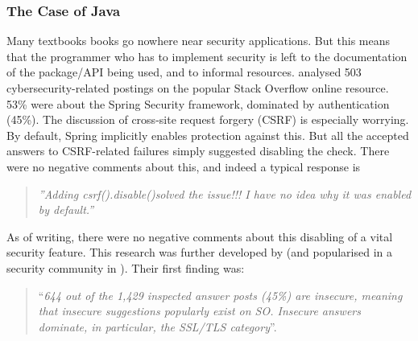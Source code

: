 \documentclass[sigconf]{acmart}
\begin{document}
\subsubsection{The Case of Java}
\begin{comment}
Took out footnotes for space

Many textbooks books go nowhere near security applications.  But this means that the programmer who has to implement security is left to the documentation of the package/API being used, and to informal resources. \cite{Mengetal2018a} analysed 503 cybersecurity-related postings on the popular Stack Overflow online resource.  53\% were about the Spring Security framework  \footnote{\url{https://projects.spring.io/spring-security/}}, dominated by authentication (45\%). The discussion \cite[\S4.3.1]{Mengetal2018a} of cross-site request forgery (CSRF) is especially worrying.  By default, Spring implicitly enables protection against this. But all the accepted answers to CSRF-related failures simply suggested disabling the check. There were no negative comments about this, and indeed a typical response is 
\end{comment}

Many textbooks books go nowhere near security applications.  But this means that the programmer who has to implement security is left to the documentation of the package/API being used, and to informal resources. \cite{Mengetal2018a} analysed 503 cybersecurity-related postings on the popular Stack Overflow online resource.  53\% were about the Spring Security framework, dominated by authentication (45\%). The discussion \cite[\S4.3.1]{Mengetal2018a} of cross-site request forgery (CSRF) is especially worrying.  By default, Spring implicitly enables protection against this. But all the accepted answers to CSRF-related failures simply suggested disabling the check. There were no negative comments about this, and indeed a typical response is 
\begin{quote}
	\textit{''Adding csrf().disable()solved the issue!!! I have no idea why it was enabled by default.''}
\end{quote}
As of writing, there were no negative comments about this disabling of a vital security feature. This research was further developed by \cite{Chenetal2019a}  (and popularised in a security community in \cite{Zorz2019a}). Their first finding was:

\begin{quote}
	``{\emph{644 out of the 1,429 inspected answer posts
			(45\%) are insecure, meaning that insecure suggestions
			popularly exist on SO. Insecure answers dominate, in
			particular, the SSL/TLS category}}''.
\end{quote} 
\end{document}
